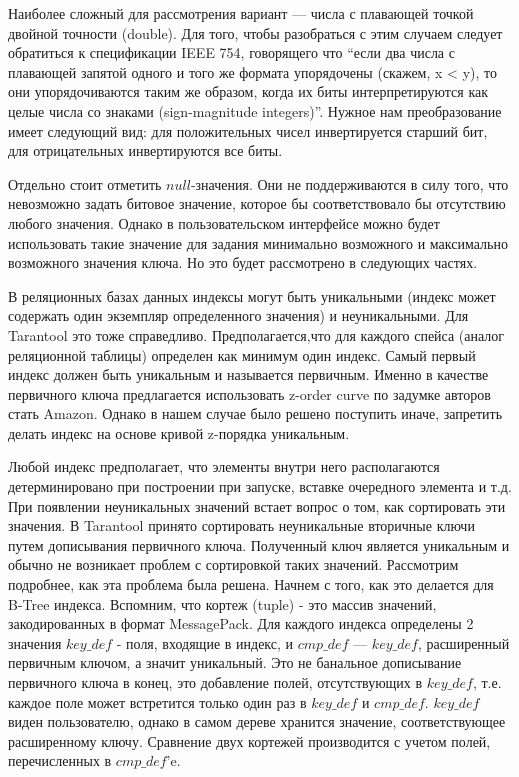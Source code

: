 Наиболее сложный для рассмотрения вариант --- числа с плавающей точкой двойной точности (double).
Для того, чтобы разобраться с этим случаем следует обратиться к спецификации IEEE 754,
говорящего что “если два числа с плавающей запятой одного и того же формата упорядочены (скажем, x < y),
то они упорядочиваются таким же образом, когда их биты интерпретируются как целые числа со знаками (sign-magnitude integers)”.
Нужное нам преобразование имеет следующий вид: для положительных чисел инвертируется старший бит, для отрицательных инвертируются все биты.

Отдельно стоит отметить $null$-значения. Они не поддерживаются в силу того, что невозможно задать битовое значение, которое бы соответствовало бы отсутствию любого значения.
Однако в пользовательском интерфейсе можно будет использовать такие значение для задания минимально возможного и максимально возможного значения ключа. Но это будет рассмотрено в следующих частях.

В реляционных базах данных индексы могут быть уникальными (индекс может содержать один экземпляр определенного значения) и неуникальными. Для Tarantool это тоже справедливо. Предполагается,что  для каждого спейса (аналог реляционной таблицы) определен как минимум один индекс. Самый первый индекс должен быть уникальным и называется первичным. Именно в качестве первичного ключа предлагается использовать z-order curve по задумке авторов стать Amazon. Однако в нашем случае было решено поступить иначе, запретить делать индекс на основе кривой z-порядка уникальным.

Любой индекс предполагает, что элементы внутри него располагаются детерминировано при построении при запуске, вставке очередного элемента и т.д. При появлении неуникальных значений встает вопрос о том, как сортировать эти значения. В Tarantool принято сортировать неуникальные вторичные ключи путем дописывания первичного ключа. Полученный ключ является уникальным и обычно не возникает проблем с сортировкой таких значений. Рассмотрим подробнее, как эта проблема была решена. Начнем с того, как это делается для B-Tree индекса. Вспомним, что кортеж (tuple) - это массив значений, закодированных в формат MessagePack. Для каждого индекса определены 2 значения $key\_def$ - поля, входящие в индекс, и $cmp\_def$ --- $key\_def$, расширенный первичным ключом, а значит уникальный. Это не банальное дописывание первичного ключа в конец, это добавление полей, отсутствующих в $key\_def$, т.е. каждое поле может встретится только один раз в $key\_def$ и $cmp\_def$. $key\_def$ виден пользователю, однако в самом дереве хранится значение, соответствующее расширенному ключу. Сравнение двух кортежей производится с учетом полей, перечисленных в $cmp\_def$’e.

